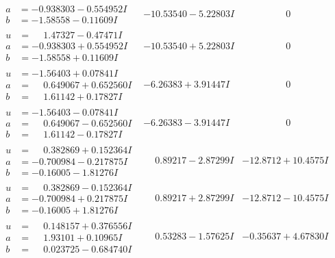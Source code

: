 \documentclass[1p]{elsarticle_modified}
\theoremstyle{definition}
\begin{document}
$$\begin{array}{c|c|c}
\begin{aligned}
a &= -0.938303 - 0.554952 I \\
b &= -1.58558 - 0.11609 I\end{aligned}
 & -10.53540 - 5.22803 I & \phantom{-0.000000 } 0 \\ \hline\begin{aligned}
u &= \phantom{-}1.47327 - 0.47471 I \\
a &= -0.938303 + 0.554952 I \\
b &= -1.58558 + 0.11609 I\end{aligned}
 & -10.53540 + 5.22803 I & \phantom{-0.000000 } 0 \\ \hline\begin{aligned}
u &= -1.56403 + 0.07841 I \\
a &= \phantom{-}0.649067 + 0.652560 I \\
b &= \phantom{-}1.61142 + 0.17827 I\end{aligned}
 & -6.26383 + 3.91447 I & \phantom{-0.000000 } 0 \\ \hline\begin{aligned}
u &= -1.56403 - 0.07841 I \\
a &= \phantom{-}0.649067 - 0.652560 I \\
b &= \phantom{-}1.61142 - 0.17827 I\end{aligned}
 & -6.26383 - 3.91447 I & \phantom{-0.000000 } 0 \\ \hline\begin{aligned}
u &= \phantom{-}0.382869 + 0.152364 I \\
a &= -0.700984 - 0.217875 I \\
b &= -0.16005 - 1.81276 I\end{aligned}
 & \phantom{-}0.89217 - 2.87299 I & -12.8712 + 10.4575 I \\ \hline\begin{aligned}
u &= \phantom{-}0.382869 - 0.152364 I \\
a &= -0.700984 + 0.217875 I \\
b &= -0.16005 + 1.81276 I\end{aligned}
 & \phantom{-}0.89217 + 2.87299 I & -12.8712 - 10.4575 I \\ \hline\begin{aligned}
u &= \phantom{-}0.148157 + 0.376556 I \\
a &= \phantom{-}1.93101 + 0.10965 I \\
b &= \phantom{-}0.023725 - 0.684740 I\end{aligned}
 & \phantom{-}0.53283 - 1.57625 I & -0.35637 + 4.67830 I \\ \hline\begin{aligned}

\end{aligned}
\end{array}$$
\end{document}
